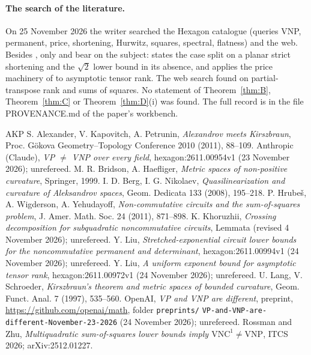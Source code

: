 \documentclass[11pt,a4paper]{article}
\theoremstyle{definition}
\begin{document}
\paragraph{The search of the literature.} On 25 November 2026 the writer
searched the Hexagon catalogue (queries VNP, permanent, price, shortening,
Hurwitz, squares, spectral, flatness) and the web. Besides \cite{Ant}, only
\cite{Liu1} and \cite{Liu2} bear on the subject: \cite{Liu1} states the case split
on a planar strict shortening and the $\sqrt2$ lower bound in its absence, and
\cite{Liu2} applies the price machinery of \cite{Ant} to asymptotic tensor rank.
The web search found \cite{RZ} on partial-transpose rank and sums of squares. No
statement of Theorem~\ref{thm:B}, Theorem~\ref{thm:C} or Theorem~\ref{thm:D}(i) was
found. The full record is in the file PROVENANCE.md of the paper's workbench.

{\small
\begin{thebibliography}{AKP}
 S. Alexander, V. Kapovitch, A. Petrunin, \emph{Alexandrov meets
Kirszbraun}, Proc. G\"okova Geometry--Topology Conference 2010 (2011), 88--109.
 Anthropic (Claude), \emph{VP $\ne$ VNP over every field},
hexagon:2611.00954v1 (23 November 2026); unrefereed.
 M. R. Bridson, A. Haefliger, \emph{Metric spaces of non-positive
curvature}, Springer, 1999.
 I. D. Berg, I. G. Nikolaev, \emph{Quasilinearization and
curvature of Aleksandrov spaces}, Geom. Dedicata 133 (2008), 195--218.
 P. Hrube\v{s}, A. Wigderson, A. Yehudayoff,
\emph{Non-commutative circuits and the sum-of-squares problem}, J. Amer. Math.
Soc. 24 (2011), 871--898.
 K. Khoruzhii, \emph{Crossing decomposition for subquadratic
noncommutative circuits}, Lemmata (revised 4 November 2026); unrefereed.
 Y. Liu, \emph{Stretched-exponential circuit lower bounds for
the noncommutative permanent and determinant}, hexagon:2611.00994v1 (24 November
2026); unrefereed.
 Y. Liu, \emph{A uniform exponent bound for asymptotic tensor
rank}, hexagon:2611.00972v1 (24 November 2026); unrefereed.
 U. Lang, V. Schroeder, \emph{Kirszbraun's theorem and metric
spaces of bounded curvature}, Geom. Funct. Anal. 7 (1997), 535--560.
 OpenAI, \emph{VP and VNP are different}, preprint,
\url{https://github.com/openai/math}, folder \texttt{preprints/}\allowbreak
\texttt{VP-and-VNP-are-different-}\allowbreak\texttt{November-23-2026}
(24 November 2026); unrefereed.
 Rossman and Zhu, \emph{Multiquadratic sum-of-squares lower
bounds imply $\mathrm{VNC}^1\ne\mathrm{VNP}$}, ITCS 2026; arXiv:2512.01227.
\end{thebibliography}
}
\end{document}
